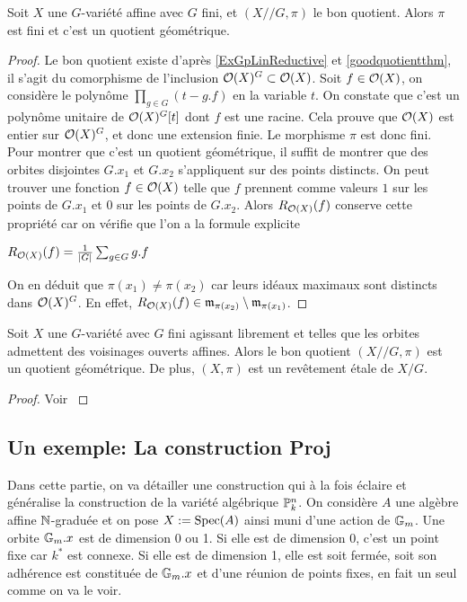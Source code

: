 \begin{prop}\label{GITEtaleFiniteGroup}
Soit $X$ une $G$-variété affine avec $G$ fini, et $(X//G,\pi)$ le bon quotient. Alors $\pi$ est fini et c'est un quotient géométrique.
\end{prop}
\begin{proof}
Le bon quotient existe d'après \ref{ExGpLinReductive} et \ref{goodquotientthm}, il s'agit du comorphisme de l'inclusion $\mathcal{O}(X)^G\subset \mathcal{O}(X)$. Soit $f\in\mathcal{O}(X)$, on considère le polynôme $\prod_{g\in G}(t-g.f)$ en la variable $t$. On constate que c'est un polynôme unitaire de $\mathcal{O}(X)^G[t]$ dont $f$ est une racine. Cela prouve que $\mathcal{O}(X)$ est entier sur $\mathcal{O}(X)^G$, et donc une extension finie. Le morphisme $\pi$ est donc fini. Pour montrer que c'est un quotient géométrique, il suffit de montrer que des orbites disjointes $G.x_1$ et $G.x_2$ s'appliquent sur des points distincts. On peut trouver une fonction $f\in\mathcal{O}(X)$ telle que $f$ prennent comme valeurs $1$ sur les points de $G.x_1$ et $0$ sur les points de $G.x_2$. Alors $R_{\mathcal{O}(X)}(f)$ conserve cette propriété car on vérifie que l'on a la formule explicite
\begin{center}
$R_{\mathcal{O}(X)}(f)=\frac{1}{|G|}\sum_{g\in G}g.f$
\end{center}
On en déduit que $\pi(x_1)\neq\pi(x_2)$ car leurs idéaux maximaux sont distincts dans $\mathcal{O}(X)^G$. En effet, $R_{\mathcal{O}(X)}(f)\in \mathfrak{m}_{\pi(x_2)}\setminus \mathfrak{m}_{\pi(x_1)}$.
\end{proof}

\begin{prop}\label{GITEtaleFiniteGroup}
Soit $X$ une $G$-variété avec $G$ fini agissant librement et telles que les orbites admettent des voisinages ouverts affines. Alors le bon quotient $(X//G,\pi)$ est un quotient géométrique. De plus, $(X,\pi)$ est un revêtement étale de $X/G$.
\end{prop}
\begin{proof}
Voir \cite[II.7]{MumfordAbelianVarieties}
\end{proof}

\subsection{Un exemple: La construction Proj}
\label{ProjConstruction}
Dans cette partie, on va détailler une construction qui à la fois éclaire et généralise la construction de la variété algébrique $\mathbb{P}^n_k$. On considère $A$ une algèbre affine $\mathbb{N}$-graduée et on pose $X:=\operatorname{Spec}(A)$ ainsi muni d'une action de $\mathbb{G}_m$. Une orbite $\mathbb{G}_m.x$ est de dimension 0 ou 1. Si elle est de dimension 0, c'est un point fixe car $k^*$ est connexe. Si elle est de dimension 1, elle est soit fermée, soit son adhérence est constituée de $\mathbb{G}_m.x$  et d'une réunion de points fixes, en fait un seul comme on va le voir.

